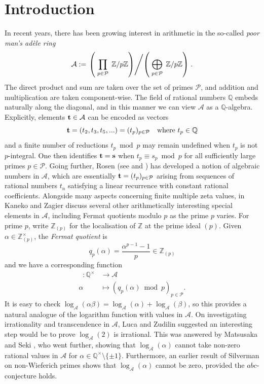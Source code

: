 \documentclass[10pt,a4paper]{amsart}
\newcommand{\cA}{\mathcal A}
\newcommand{\cP}{\mathcal P}
\DeclareMathOperator{\logA}{\log_{\mathcal{A}}}
\begin{document}
\section{Introduction}
In recent years, there has been growing interest in arithmetic in the so-called {\it poor man's ad\`{e}le ring}
\[\cA:=\left.\left(\;\prod_{p\in\cP}\;\mathbb{Z}/p\mathbb{Z}\right) \middle/ \left(\;\bigoplus_{p\in\cP}\;\mathbb{Z}/p\mathbb{Z}\right)\right.. \]
The direct product and sum are taken over the set of primes $\cP$, and addition and multiplication are taken component-wise.
The field of rational numbers $\mathbb{Q}$ embeds naturally along the diagonal, and in this manner we can view $\mathcal{A}$ as a $\mathbb{Q}$-algebra. 
Explicitly, elements ${\bf t}\in\cA$ can be encoded as vectors
\[{\bf t}=(t_2, t_3, t_5,...) = (t_p)_{p\in\mathcal{P}}\quad\text{where $t_p\in\mathbb{Q}$}\]
and a finite number of reductions $t_p\bmod p$ may remain undefined when $t_p$ is not $p$-integral. 
One then identifies ${\bf t}={\bf s}$ when $t_p\equiv s_p\bmod p$ for all sufficiently large primes $p\in\cP$. Going further, Rosen (see \cite{Ro20} and \cite{RTTY24}) has developed a notion of algebraic numbers in $\mathcal{A}$, which are essentially ${\bf t}=(t_p)_{p\in\mathcal{P}}$ arising from sequences of rational numbers $t_n$ satisfying a linear recurrence with constant rational coefficients. 
Alongside many aspects concerning finite multiple zeta values, in \cite{KZ} Kaneko and Zagier discuss several other arithmetically interesting special elements in $\cA$, including Fermat quotients modulo $p$ as the prime $p$ varies. 
For prime $p$, write $\mathbb{Z}_{(p)}$ for the localisation of $\mathbb{Z}$ at the prime ideal $(p)$. 
Given $\alpha\in\mathbb{Z}_{(p)}^\times$, the {\it Fermat quotient} is
\[q_p(\alpha)=\frac{\alpha^{p-1}-1}{p}\in\mathbb{Z}_{(p)}\]
and we have a corresponding function
\begin{align*}
\logA:\mathbb{Q}^\times & \longrightarrow\cA \\
\alpha& \longmapsto \left(q_p(\alpha)\bmod p\right)_{p\in\cP}.
\end{align*}
It is easy to check $\log_\cA(\alpha\beta)=\log_\cA(\alpha)+\log_\cA(\beta)$, so this provides a natural analogue of the logarithm function with values in $\cA$. On investigating irrationality and transcendence in $\cA$, Luca and Zudilin \cite{LZ25} suggested an interesting step would be to prove $\log_\cA(2)$ is irrational. This was answered by Matsusaka and Seki \cite{MS26}, who went further, showing that $\log_\cA(\alpha)$ cannot take non-zero rational values in $\cA$ for $\alpha\in\mathbb{Q}^\times\setminus\{\pm 1\}$. Furthermore, an earlier result of Silverman \cite{Si88} on non-Wieferich primes shows that $\log_\cA(\alpha)$ cannot be zero, provided the $abc$-conjecture holds.
\end{document}
